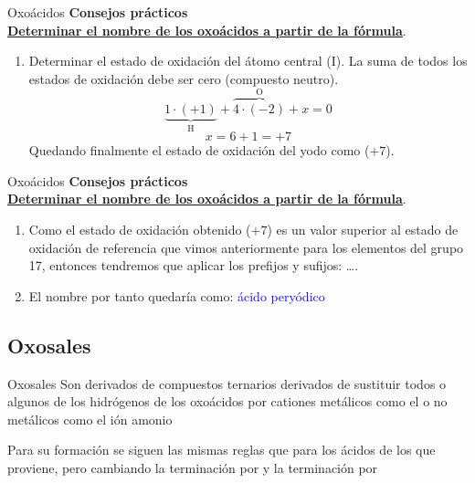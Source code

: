 \documentclass{beamer}
\newcommand*{\numberballmDarkTeal}{\protect\cnumero{\arabic*}{mDarkTeal}}
\newcommand{\examplebeamer}[1]{{\color{mLightGreen}\textbf{#1}}}
\newcommand{\alertbeamer}[1]{\alert{\textbf{#1}}}
\newcommand{\nline}[1][6pt]{\\[#1]}
\begin{document}
\begin{frame}[c]{Oxoácidos}
    \alertbeamer{\Large Consejos prácticos}\nline{}
    \examplebeamer{\uline{Determinar el nombre de los oxoácidos a partir de la fórmula}}. \nline{}
    \begin{enumerate}[label=\numberballmDarkTeal]
        \item Determinar el estado de oxidación del átomo central (I). La suma de todos los estados de oxidación debe ser cero (compuesto neutro).
              \begin{equation*}
                  \underbrace{1\cdot(+1)}_{\text{H}} + \overbrace{4\cdot(-2)}^{\text{O}} + x = 0
              \end{equation*}
              \begin{equation*}
                  x = 6+1 = +7
              \end{equation*}
              Quedando finalmente el estado de oxidación del yodo como ($+7$).
    \end{enumerate}
\end{frame}

\begin{frame}[c]{Oxoácidos}
    \alertbeamer{\Large Consejos prácticos}\nline{}
    \examplebeamer{\uline{Determinar el nombre de los oxoácidos a partir de la fórmula}}. \nline{}
    \begin{enumerate}[label=\numberballmDarkTeal]
        \addtocounter{enumi}{1}
        \item Como el estado de oxidación obtenido ($+7$) es un valor superior al estado de oxidación de referencia que vimos anteriormente para los elementos del grupo 17, entonces tendremos que aplicar los prefijos y sufijos:  \dots {}.
        \item El nombre por tanto quedaría como: \textcolor{blue}{ácido peryódico}
    \end{enumerate}
\end{frame}


\subsection{Oxosales}

\begin{frame}[t]{Oxosales}
    Son derivados de compuestos ternarios derivados de sustituir todos o algunos de los hidrógenos de los oxoácidos por cationes metálicos como el  o no metálicos como el ión amonio 
    \begin{center}

    \end{center}

    Para su formación se siguen las mismas reglas que para los ácidos de los que proviene, pero cambiando la terminación  por  y la terminación  por 

\end{frame}
\end{document}
